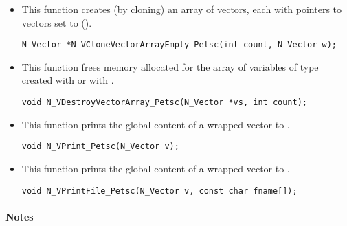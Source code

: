 \begin{itemize}

\item {}
 
  This function creates (by cloning) an array of  {\nvecpetsc} vectors,
  each with pointers to {\petsc} vectors set to ().
 
\begin{verbatim}
N_Vector *N_VCloneVectorArrayEmpty_Petsc(int count, N_Vector w);
\end{verbatim}


\item {}
 
 This function frees memory allocated for the array of  variables of
 type  created with  or with
 .
 

 \verb|void N_VDestroyVectorArray_Petsc(N_Vector *vs, int count);|



\item {}
  
  This function prints the global content of a wrapped {\petsc} vector to .
    
  \verb|void N_VPrint_Petsc(N_Vector v);|


\item {}
  
  This function prints the global content of a wrapped {\petsc} vector to .

  \verb|void N_VPrintFile_Petsc(N_Vector v, const char fname[]);|

\end{itemize}
\paragraph{\bf Notes} 
           
